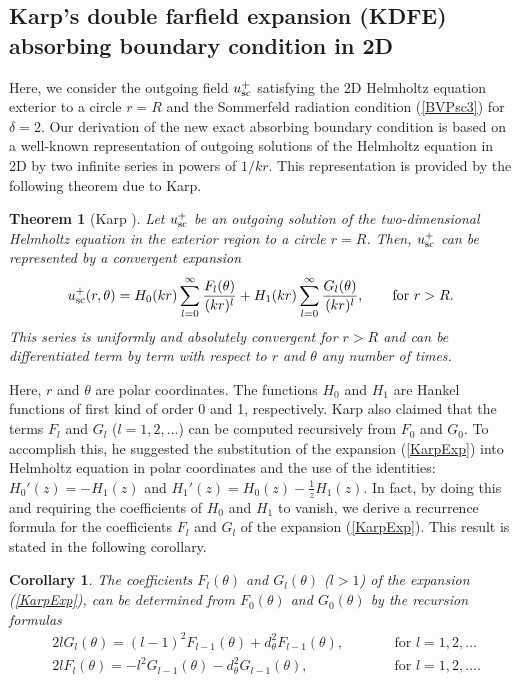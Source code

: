 \documentclass[final,3p,times,12pt]{elsarticle}
\newtheorem{Theorem}{Theorem}
\newtheorem{Corollary}{Corollary}
\newcommand{\usc}{u_{\rm sc}}
\begin{document}
\subsection{Karp's double farfield expansion (KDFE) absorbing boundary condition in 2D} \label{Section.ABC2D}

Here, we consider the outgoing field $\usc^{+}$ satisfying the 2D Helmholtz equation exterior to a circle $r=R$ and the Sommerfeld radiation condition (\ref{BVPsc3}) for $\delta = 2$. Our derivation of the new exact absorbing boundary condition is based on a well-known representation of outgoing solutions of the Helmholtz equation in 2D by two infinite series in powers of  $1/kr$. This representation is provided by the following theorem due to Karp.

\begin{Theorem}[Karp \cite{Karp}] \label{Thm.Karp}
Let $\usc^{+}$ be an outgoing solution of the two-dimensional Helmholtz equation in the exterior region to a circle $r=R$. Then, $\usc^{+}$ can be represented by a convergent expansion
\begin{eqnarray}
\usc^{+} (r,\theta) = H_0(kr) \sum_{l=0}^{\infty} \frac{F_l(\theta)}{(kr)^l} + H_1(kr) \sum_{l=0}^{\infty} \frac{G_l(\theta)}{(kr)^l}, \qquad \mbox{for}\,\, r> R. \label{KarpExp}
\end{eqnarray}
This series is uniformly and absolutely convergent for $r>R$ and can be differentiated term by term with respect to $r$ and $\theta$ any number of times.
\end{Theorem}
\noindent Here, $r$ and $\theta$ are polar coordinates. The functions $H_0$ and $H_1$ are Hankel functions of first kind of order 0 and 1, respectively. Karp also claimed that the terms $F_l$ and $G_l$ ($l=1,2,\dots$) can be computed recursively from $F_0$ and $G_0$. To accomplish this, he suggested the substitution of the expansion (\ref{KarpExp}) into Helmholtz equation in polar coordinates and the use of the identities:
$H_0'(z)=-H_1(z)$ and $H_1'(z)= H_0(z) - \frac{1}{z}H_1(z)$. In fact, by doing this and requiring the coefficients of $H_0$ and $H_1$ to vanish, we derive a recurrence formula for the coefficients $F_l$ and $G_l$ of the expansion (\ref{KarpExp}). This result is stated in the following corollary.
\begin{Corollary} \label{KarpRecurrence}
The coefficients $F_l(\theta)$ and $G_l(\theta)$ ($l>1$) of the expansion (\ref{KarpExp}),  can be determined from $F_0(\theta)$ and $G_0(\theta)$ by the recursion formulas
\begin{align}
& 2 l G_{l}(\theta) = (l-1)^2 F_{l-1}(\theta) + d^2_{\theta}  F_{l-1}(\theta) , \qquad && \text{for $l=1,2, \dots$} \label{Recurrence1}\\
& 2 l F_{l}(\theta) = - l^2 G_{l-1}(\theta) - d^2_{\theta} G_{l-1}(\theta), 
\qquad && \text{for $l=1,2, \dots$}. \label{Recurrence2}
\end{align}
\end{Corollary}
\end{document}
